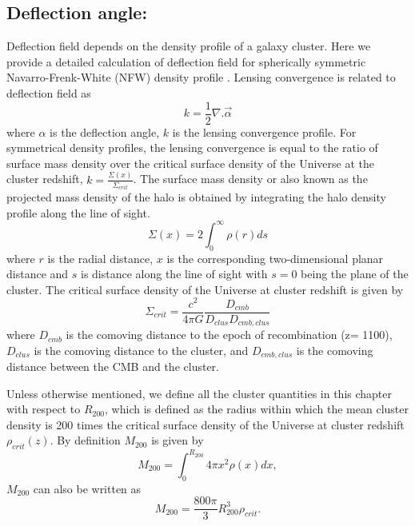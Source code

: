 \subsection*{Deflection angle:}
\label{sec_def_field}
Deflection field depends on the density profile of a galaxy cluster. Here we provide a detailed calculation of deflection field for spherically symmetric Navarro-Frenk-White (NFW) density profile \cite{navarro96}.  Lensing convergence is related to deflection field as %
\begin{equation}
 k = \frac{1}{2}\nabla. \vec{\alpha} %
\label{eq_kappa}
 \end{equation}
 where $\alpha$ is the deflection angle, $k$ is the lensing convergence profile. %
 For symmetrical density profiles, the lensing convergence is equal to the ratio of surface mass density over the critical surface density of the Universe at the cluster redshift, $k = \frac{\Sigma(x)}{\Sigma_{crit}}$.
The surface mass density or also known as the projected mass density of the halo is obtained by integrating the halo density profile along the line of sight. 
 \begin{equation}
 \Sigma(x) = 2 \int^{\infty}_{0} \rho(r) ds
 \label{eq:surface_density}
 \end{equation}
 where $r$ is the radial distance, $x$ is the corresponding two-dimensional planar distance and $s$ is distance along the line of sight with $s = 0$ being the plane of the cluster.
 The critical surface density of the Universe at cluster redshift is given by
 \begin{equation}
 \Sigma_{crit} = \frac{c^{2}}{4\pi G} \frac{D_{cmb}}{D_{clus}D_{cmb,clus}}
 \end{equation}
 where $D_{cmb}$ is the comoving distance to the epoch of recombination (z= 1100), $D_{clus}$ is the comoving distance to the cluster, and $D_{cmb,clus}$ is the comoving distance between the CMB and the cluster.
 
 Unless otherwise mentioned, we define all the cluster quantities in this chapter with respect to $R_{200}$, which is defined as the radius within which the mean cluster density is 200 times the critical surface density of the Universe at cluster redshift $\rho_{crit}(z)$. By definition $M_{200}$ is given by 
 \begin{equation}
 M_{200} = \int^{R_{200}}_{0}  4\pi x^{2} \rho(x) dx,
 \end{equation}
 $M_{200}$ can also be written as
 \begin{equation}
 M_{200} = \frac{800\pi}{3} R^{3}_{200} \rho_{crit}.
 \end{equation}
 
